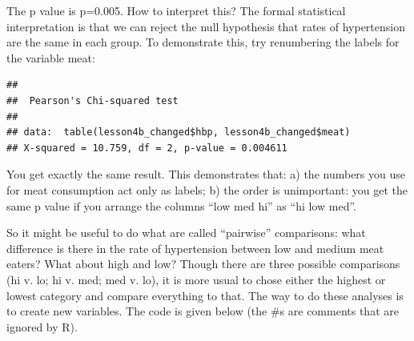 \documentclass[]{book}
\newenvironment{Shaded}{\begin{snugshade}}{\end{snugshade}}
\newcommand{\DataTypeTok}[1]{\textcolor[rgb]{0.13,0.29,0.53}{#1}}
\newcommand{\DecValTok}[1]{\textcolor[rgb]{0.00,0.00,0.81}{#1}}
\newcommand{\FloatTok}[1]{\textcolor[rgb]{0.00,0.00,0.81}{#1}}
\newcommand{\KeywordTok}[1]{\textcolor[rgb]{0.13,0.29,0.53}{\textbf{#1}}}
\newcommand{\NormalTok}[1]{#1}
\newcommand{\OperatorTok}[1]{\textcolor[rgb]{0.81,0.36,0.00}{\textbf{#1}}}
\newcommand{\OtherTok}[1]{\textcolor[rgb]{0.56,0.35,0.01}{#1}}
\newcommand{\StringTok}[1]{\textcolor[rgb]{0.31,0.60,0.02}{#1}}
\begin{document}
The p value is p=0.005. How to interpret this? The formal statistical
interpretation is that we can reject the null hypothesis that rates of
hypertension are the same in each group. To demonstrate this, try
renumbering the labels for the variable meat:

\begin{Shaded}
\end{Shaded}

\begin{verbatim}
## 
##  Pearson's Chi-squared test
## 
## data:  table(lesson4b_changed$hbp, lesson4b_changed$meat)
## X-squared = 10.759, df = 2, p-value = 0.004611
\end{verbatim}

You get exactly the same result. This demonstrates that: a) the numbers
you use for meat consumption act only as labels; b) the order is
unimportant: you get the same p value if you arrange the columns ``low
med hi'' as ``hi low med''.

So it might be useful to do what are called ``pairwise'' comparisons:
what difference is there in the rate of hypertension between low and
medium meat eaters? What about high and low? Though there are three
possible comparisons (hi v. lo; hi v. med; med v. lo), it is more usual
to chose either the highest or lowest category and compare everything to
that. The way to do these analyses is to create new variables. The code
is given below (the \#s are comments that are ignored by R).
\end{document}
